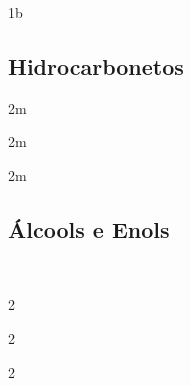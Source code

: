 \documentclass[\mainfilename]{subfiles}
\begin{document}
\begin{exampleBox}1b{} %
    \subsection*{Hidrocarbonetos}
    \vspace{-4ex}
    \begin{multicols}{3}
        \begin{exampleBox}2m{}
            \centering
            \\
        \end{exampleBox}
        
        \begin{exampleBox}2m{}\centering
            \\
        \end{exampleBox}
    
        \begin{exampleBox}2m{}\centering
            \\
        \end{exampleBox}
    \end{multicols}
    
    \subsection*{Álcools e Enols}\\
    \vspace{-4ex}
    \begin{multicols}{2}
        
        \begin{exampleBox}2{}\centering
            \\
        \end{exampleBox}
        
        \begin{exampleBox}2{}\centering
            \\
        \end{exampleBox}
        
        \begin{exampleBox}2{}\centering
            \\
        \end{exampleBox}
        

\end{multicols}
\end{exampleBox}
\end{document}
